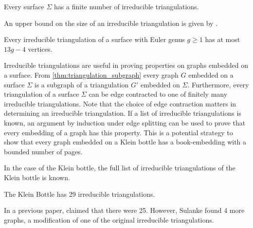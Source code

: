 \begin{theorem}
    Every surface $\Sigma$ has a finite number of irreducible triangulations.
\end{theorem}

An upper bound on the size of an irreducible triangulation is given by \textcite{joretIrreducibleTriangulationsAre2010}.

\begin{theorem}
    Every irreducible triangulation of a surface with Euler genus $g \geq 1$ has at most $13g - 4$ vertices. 
\end{theorem}

Irreducible triangulations are useful in proving properties on graphs embedded on a surface. From \cref{thm:triangulation_subgraph} every graph $G$ embedded on a surface $\Sigma$ is a subgraph of a triangulation $G'$ embedded on $\Sigma$. Furthermore, every triangulation of a surface $\Sigma$ can be edge contracted to one of finitely many irreducible triangulations. Note that the choice of edge contraction matters in determining an irreducible triangulation. If a list of irreducible triangulations is known, an argument by induction under edge splitting can be used to prove that every embedding of a graph has this property. This is a potential strategy to show that every graph embedded on a Klein bottle has a book-embedding with a bounded number of pages. 

In the case of the Klein bottle, the full list of irreducible triangulations of the Klein bottle is known. 
\begin{theorem}
    The Klein Bottle has 29 irreducible triangulations. 
\end{theorem} 
In a previous paper, \textcite{lawrencenkoIrreducibleTriangulationsKlein1997} claimed that there were 25. However, Sulanke found 4 more graphs, a modification of one of the original irreducible triangulations. 

